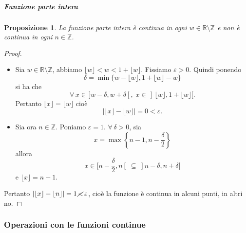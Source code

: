 \documentclass{article}
\theoremstyle{plain}
\newtheorem{prop}[thm]{Proposizione}
\theoremstyle{definition}
\theoremstyle{remark}
\begin{document}
\vspace{10pt}

\subparagraph{Funzione parte intera}
\begin{bxthm}
\begin{prop}
    La funzione parte intera è continua in ogni $w\in\mathbb{R}\setminus\mathbb{Z}$ e non è continua in ogni $n\in\mathbb{Z}$.
\end{prop}
\end{bxthm}
\begin{proof}\hfill
    \begin{itemize}
        \item Sia $w\in\mathbb{R}\setminus\mathbb{Z}$, abbiamo $\lfloor w\rfloor <w<1+\lfloor w\rfloor$. 
        Fissiamo $\varepsilon>0$.
        Quindi ponendo \[\delta=\min\{w-\lfloor w\rfloor, 1+\lfloor w\rfloor-w\}\]
        si ha che 
        \[\forall\, x\in\, ]w-\delta,w+\delta[,\;x\in\,]\,\lfloor w\rfloor,1+\lfloor w\rfloor[.\]
        Pertanto $\lfloor x\rfloor=\lfloor w\rfloor$ cioè \[|\lfloor x\rfloor-\lfloor w\rfloor|=0<\varepsilon.\]
        \item Sia ora $n\in\mathbb{Z}$. Poniamo $\varepsilon=1$.
        $\forall\, \delta>0$, sia \[x=\max\left\{n-1,n-\dfrac{\delta}{2}\right\}\]
        allora \[x\in[n-\frac{\delta}{2},n[ \;\subseteq\; ]n-\delta,n+\delta[\]
        e $\lfloor x\rfloor=n-1$.
    \end{itemize}
    Pertanto $|\lfloor x\rfloor-\lfloor n\rfloor|=1\,\cancel{<}\,\varepsilon$, cioè la funzione è continua in alcuni punti, in altri no.
\end{proof}

\vspace{10pt}

\subsubsection{Operazioni con le funzioni continue}

\vspace{10pt}
\end{document}
